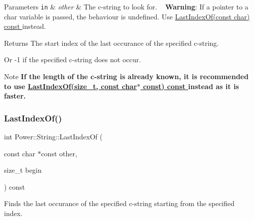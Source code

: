 \begin{DoxyParams}[1]{Parameters}
\mbox{\tt in}  & {\em other} & The c-\/string to look for. ~\newline
 {\bfseries Warning}\+: If a pointer to a char variable is passed, the behaviour is undefined. Use \hyperlink{class_power_1_1_string_a5d19cb2d35f6cd396c1910579b5ba89e}{Last\+Index\+Of(const char) const }instead. \\
\hline
\end{DoxyParams}
\begin{DoxyReturn}{Returns}
The start index of the last occurance of the specified c-\/string. 

Or -\/1 if the specified c-\/string does not occur. 
\end{DoxyReturn}
\begin{DoxyNote}{Note}
{\bfseries If the length of the c-\/string is already known, it is recommended to use \hyperlink{class_power_1_1_string_a9709f06b80356a5aa4f921f3b29162f1}{Last\+Index\+Of(size\+\_\+t, const char$\ast$ const) const }instead as it is faster.} 
\end{DoxyNote}
\mbox{\label{class_power_1_1_string_a60a3c0874cb68c943e5c36192db3be02}} 
\subsubsection{\texorpdfstring{Last\+Index\+Of()}{LastIndexOf()}\hspace{0.1cm}{\footnotesize\ttfamily [5/12]}}
{\footnotesize\ttfamily int Power\+::\+String\+::\+Last\+Index\+Of (\begin{DoxyParamCaption}\item[{const char $\ast$const}]{other,  }\item[{size\+\_\+t}]{begin }\end{DoxyParamCaption}) const\hspace{0.3cm}{\ttfamily [inline]}}



Finds the last occurance of the specified c-\/string starting from the specified index. 


